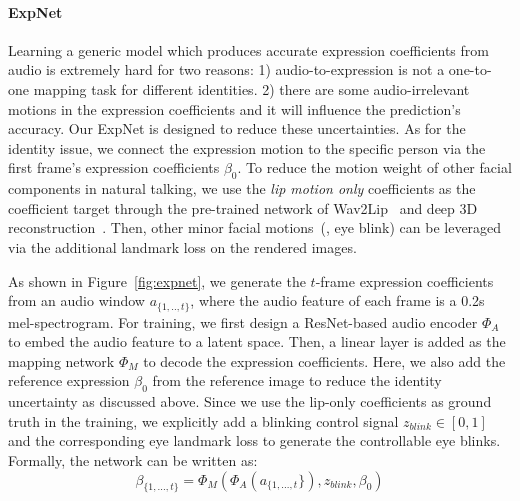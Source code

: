 
\paragraph{ExpNet}

Learning a generic model which produces accurate expression coefficients from audio is extremely hard for two reasons: 1) audio-to-expression is not a one-to-one mapping task for different identities. 2) there are some audio-irrelevant motions in the expression coefficients and it will influence the prediction's accuracy. 
Our ExpNet is designed to reduce these uncertainties. As for the identity issue, we connect the expression motion to the specific person via the first frame's expression coefficients $\beta_0$. 
To reduce the motion weight of other facial components in natural talking, we use the \textit{lip motion only} coefficients as the coefficient target through the pre-trained network of Wav2Lip~\cite{wav2lip} and deep 3D reconstruction~\cite{deng2019accurate}. Then, other minor facial motions~(\eg, eye blink) can be leveraged via the additional landmark loss on the rendered images.



As shown in Figure~\ref{fig:expnet}, we generate the $t$-frame expression coefficients from an audio window $a_{\{1,..,t\}}$, where the audio feature of each frame is a 0.2s mel-spectrogram. For training, we first design a ResNet-based audio encoder $\Phi_{A}$\cite{resnet, wav2lip} to embed the audio feature to a latent space. Then, a linear layer is added as the mapping network $\Phi_{M}$ to decode the expression coefficients. Here, we also add the reference expression $\beta_{0}$ from the reference image to reduce the identity uncertainty as discussed above. Since 
we use the lip-only coefficients as ground truth in the training, we explicitly add a blinking control signal $z_{blink} \in [0, 1]$ and the corresponding eye landmark loss to generate the controllable eye blinks. Formally, the network can be written as:
\begin{equation}
\beta_{\{1,...,t\}} = \Phi_{M}(\Phi_{A}(a_{\{1,...,t}\}), z_{blink}, \beta_{0})
\end{equation}


